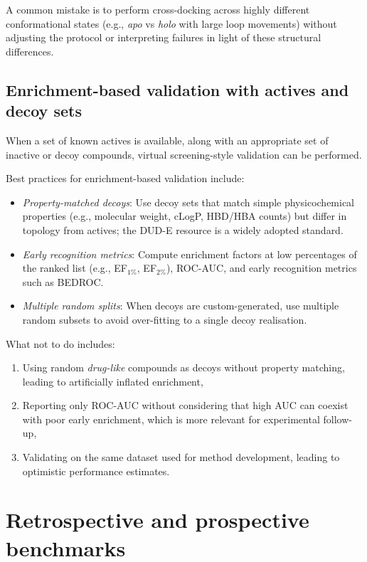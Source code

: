\documentclass[12pt]{article}
\begin{document}
A common mistake is to perform cross-docking across highly different conformational states (e.g., \emph{apo} vs \emph{holo} with large loop movements) without adjusting the protocol or interpreting failures in light of these structural differences.

\subsection{Enrichment-based validation with actives and decoy sets}

When a set of known actives is available, along with an appropriate set of inactive or decoy compounds, virtual screening-style validation can be performed\cite{CH8_Verdonk2004,CH8_DUD-E2012}.

Best practices for enrichment-based validation include:

\begin{itemize}
  \item \emph{Property-matched decoys}: Use decoy sets that match simple physicochemical properties (e.g., molecular weight, cLogP, HBD/HBA counts) but differ in topology from actives; the DUD-E resource is a widely adopted standard\cite{CH8_DUD-E2012}.
  \item \emph{Early recognition metrics}: Compute enrichment factors at low percentages of the ranked list (e.g., EF$_{1\%}$, EF$_{2\%}$), ROC-AUC, and early recognition metrics such as BEDROC\cite{CH8_Truchon2007}.
  \item \emph{Multiple random splits}: When decoys are custom-generated, use multiple random subsets to avoid over-fitting to a single decoy realisation.
\end{itemize}

What not to do includes:

\begin{enumerate}
  \item Using random \emph{drug-like} compounds as decoys without property matching, leading to artificially inflated enrichment,
  \item Reporting only ROC-AUC without considering that high AUC can coexist with poor early enrichment, which is more relevant for experimental follow-up\cite{CH8_Truchon2007},
  \item Validating on the same dataset used for method development, leading to optimistic performance estimates.
\end{enumerate}

\section{Retrospective and prospective benchmarks}
\end{document}

